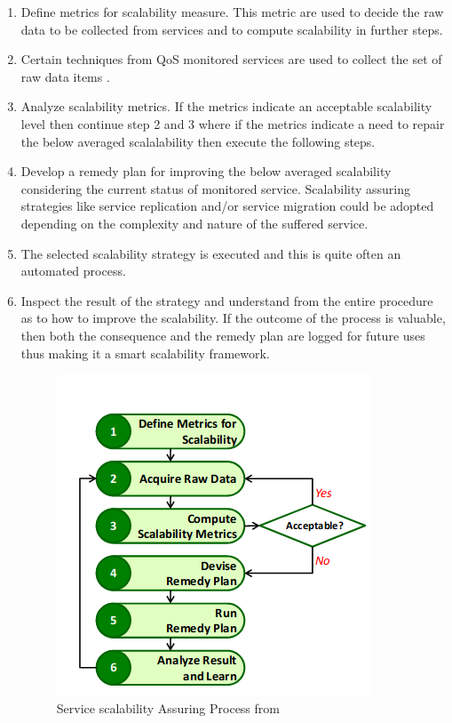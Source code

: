 \begin{enumerate}
	

\item Define metrics for scalability measure. This metric are used to decide the raw data to be collected from services and to compute scalability in further steps.

\item Certain techniques from QoS monitored services are used to collect the set of raw data items \cite{Artaiam2008EnhancingSQ} \cite{hutchison_monitoring_2007}.

\item Analyze scalability metrics. If the metrics indicate an acceptable scalability level then continue step 2 and 3 where if the metrics indicate a need to repair the below averaged scalalability then execute the following steps. 

\item Develop a remedy plan for improving the below averaged scalability considering the current status of monitored service. Scalability assuring strategies like service replication and/or service migration could be adopted depending on the complexity and nature of the suffered service. 

\item The selected scalability strategy is executed and this is quite often an automated process. 

\item Inspect the result of the strategy and understand from the entire procedure as to how to improve the scalability. If the outcome of the process is valuable, then both the consequence and the remedy plan are logged for future uses thus making it a smart scalability framework.


\begin{figure}[h]
	\centering
	\includegraphics[width=0.7\linewidth]{figures/ServiceScalability}
	\caption{Service scalability Assuring Process from \cite{lee_software_2010}}
	\label{fig:servicescalability}
\end{figure}

\end{enumerate}

